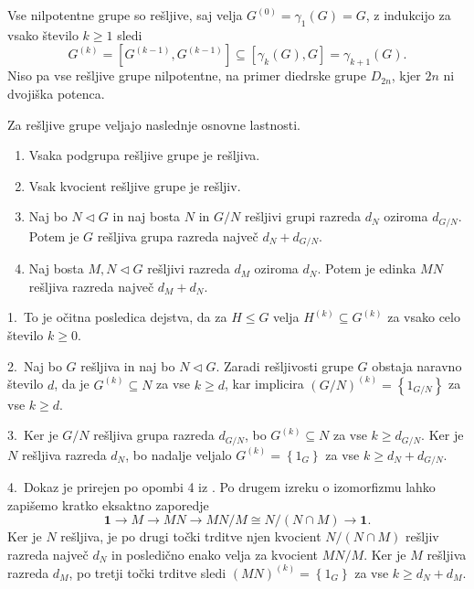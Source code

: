     \begin{primer}
        Vse nilpotentne grupe so rešljive, saj velja $G^{(0)} = \gamma_1(G) = G$, z indukcijo za vsako število $k \ge 1$ sledi \begin{equation*}
        G^{(k)} = [G^{(k-1)}, G^{(k-1)}] \subseteq  [\gamma_{k}(G), G] = \gamma_{k + 1}(G).
        \end{equation*}
        Niso pa vse rešljive grupe nilpotentne, na primer diedrske grupe $D_{2n}$, kjer $2n$ ni dvojiška potenca. 
    \end{primer}
    
    \begin{trditev}
    \label{trd_lastnosti_resljivih_grup}
    Za rešljive grupe veljajo naslednje osnovne lastnosti.
     \begin{enumerate}
        \item Vsaka podgrupa rešljive grupe je rešljiva.
        \item Vsak kvocient rešljive grupe je rešljiv.
        \item Naj bo $N \triangleleft G$ in naj bosta $N$ in $G / N$ rešljivi grupi razreda $d_{N}$ oziroma $d_{G / N}$. Potem je $G$ rešljiva grupa razreda največ $d_N + d_{G / N}$.
        \item Naj bosta $M, N \triangleleft G$ rešljivi razreda $d_M$ oziroma $d_N$. Potem je edinka $MN$ rešljiva razreda največ $d_M + d_N$.   
     \end{enumerate}
    \end{trditev}
    \begin{dokaz}
        
            1.~To je očitna posledica dejstva, da za $H \le G$ velja $H^{(k)} \subseteq G^{(k)}$ za vsako celo število $k \ge 0$.

            2.~Naj bo $G$ rešljiva in naj bo $N \triangleleft G$. Zaradi rešljivosti grupe $G$ obstaja naravno število $d$, da je $G^{(k)} \subseteq N$ za vse $k \ge d$, kar implicira $ (G / N)^{(k)} = \left\{ 1_{G / N}\right\}$ za vse $k \ge d$. 
            
            3.~Ker je $G / N$ rešljiva grupa razreda $d_{G / N}$, bo $G^{(k)} \subseteq N$ za vse $k \ge d_{G / N}$. Ker je $N$ rešljiva razreda $d_N$, bo nadalje veljalo $G^{(k)} = \left\{ 1_G\right\}$ za vse $k \ge d_N + d_{G / N}$.
            
            4.~Dokaz je prirejen po opombi 4 iz \cite[str.4]{Schneider_2016}. Po drugem izreku o izomorfizmu lahko zapišemo kratko eksaktno zaporedje \begin{equation*}
            \mathbf{1} \to M \to MN \to MN / M \cong N / (N \cap M) \to \mathbf{1}.
            \end{equation*}  
            Ker je $N$ rešljiva, je po drugi točki trditve  njen kvocient $ N / (N \cap M)$ rešljiv razreda največ $d_N$ in posledično enako velja za kvocient $ MN / M $. Ker je $M$ rešljiva razreda $d_M$, po tretji točki trditve sledi $(MN)^{(k)} = \left\{ 1_{G}\right\}$ za vse $k \ge d_N + d_M$.
    \end{dokaz}

